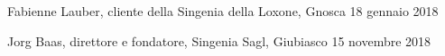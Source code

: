 \noindent Fabienne Lauber, cliente della Singenia della Loxone, Gnosca 18 gennaio 2018

\noindent Jorg Baas, direttore e fondatore, Singenia Sagl, Giubiasco 15 novembre 2018